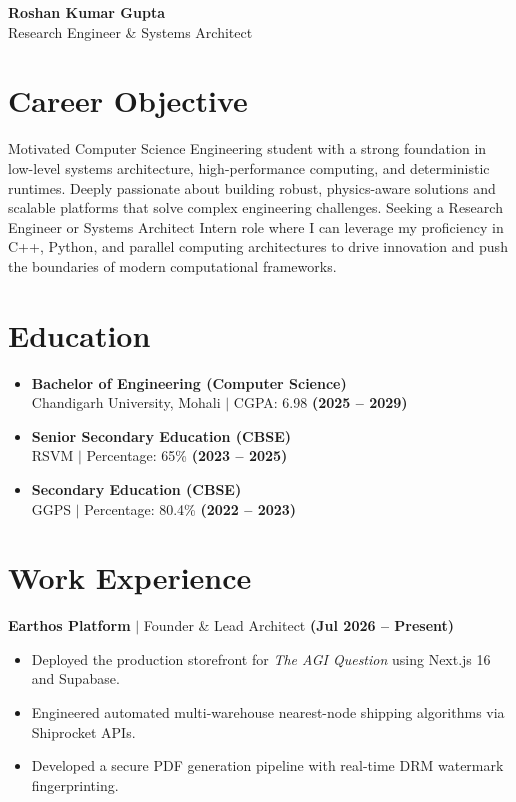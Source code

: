 \documentclass[9pt,a4paper]{extarticle}
\begin{document}
\pagestyle{empty}

\noindent
{\Huge \textbf{\color{primary}Roshan Kumar Gupta}} \\[2mm]
{\Large Research Engineer \& Systems Architect} \\
\vspace{2mm}

\noindent
\begin{minipage}[t]{0.63\textwidth}
\vspace*{0pt} %

\section{Career Objective}
Motivated Computer Science Engineering student with a strong foundation in low-level systems architecture, high-performance computing, and deterministic runtimes. Deeply passionate about building robust, physics-aware solutions and scalable platforms that solve complex engineering challenges. Seeking a Research Engineer or Systems Architect Intern role where I can leverage my proficiency in C++, Python, and parallel computing architectures to drive innovation and push the boundaries of modern computational frameworks.

\section{Education}
\begin{itemize}[leftmargin=12pt, itemsep=1pt, parsep=0pt]
    \item \textbf{Bachelor of Engineering (Computer Science)} \\ Chandigarh University, Mohali $|$ CGPA: 6.98 \textbf{(2025 -- 2029)}
    \item \textbf{Senior Secondary Education (CBSE)} \\ RSVM $|$ Percentage: 65\% \textbf{(2023 -- 2025)}
    \item \textbf{Secondary Education (CBSE)} \\ GGPS $|$ Percentage: 80.4\% \textbf{(2022 -- 2023)}
\end{itemize}

\section{Work Experience}
\textbf{Earthos Platform} $|$ Founder \& Lead Architect \textbf{(Jul 2026 -- Present)}
\begin{itemize}[leftmargin=12pt, itemsep=1pt, parsep=0pt]
    \item Deployed the production storefront for \textit{The AGI Question} using Next.js 16 and Supabase.
    \item Engineered automated multi-warehouse nearest-node shipping algorithms via Shiprocket APIs.
    \item Developed a secure PDF generation pipeline with real-time DRM watermark fingerprinting.
\end{itemize}
\vspace{2.5mm}


\end{minipage}
\end{document}
